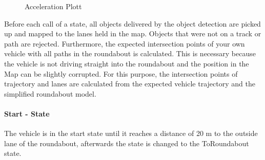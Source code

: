 \documentclass[11pt,oneside,openright]{mpreport}
\begin{document}
\begin{figure}[!ht]
\caption{Acceleration Plott}
\begin{center}
\label{max_accel}
\end{center}
\end{figure}



Before each call of a state, all objects delivered by the object detection are picked up and mapped to the lanes held in the map.
Objects that were not on a track or path are rejected.
Furthermore, the expected intersection points of your own vehicle with all paths in the roundabout is calculated. 
This is necessary because the vehicle is not driving straight into the roundabout and the position in the Map can be slightly corrupted. For this purpose,
the intersection points of trajectory and lanes are calculated from the expected vehicle trajectory and the simplified roundabout model.

\paragraph{Start - State}
The vehicle is in the start state until it reaches a distance of 20 m to the outside lane of the roundabout, afterwards the state is changed to the ToRoundabout state.
\end{document}
